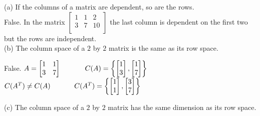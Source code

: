 \documentclass[10pt,twoside,reqno]{article}
\begin{document}
\begin{enumerate}
(a) If the columns of a matrix are dependent, so are the rows.\\
\vspace{3mm} 
\hspace{8mm}False. In the matrix 
$
$$
\begin{bmatrix}
1&1&2\\
3&7&10\\
\end{bmatrix}
$$
$
 the last column is dependent on the first two but the rows are independent. \\ \vspace{4mm}
(b) The column space of a $2$ by $2$ matrix is the same as its row space.\\
\vspace{3mm} 
\begin{center}
False. 
$
$$
A =
\begin{bmatrix}
1&1\\
3&7\\
\end{bmatrix}
\hspace{12mm}
C(A)=\left\{
\begin{bmatrix}
1\\
3\\
\end{bmatrix},
\begin{bmatrix}
1\\
7\\
\end{bmatrix}
\right\}
$$
$ \\ \vspace{2mm}
$
$$
C(A^T) \neq C(A)
\hspace{12mm}
C(A^T)=\left\{
\begin{bmatrix}
1\\
1\\
\end{bmatrix},
\begin{bmatrix}
3\\
7\\
\end{bmatrix}
\right\}
$$
$
\end{center}
(c) The column space of a $2$ by $2$ matrix has the same dimension as its row space.\\
\vspace{3mm} 

\end{enumerate}
\end{document}
